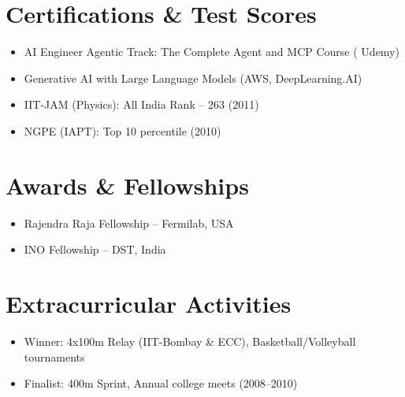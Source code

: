 \documentclass[a4paper,10pt]{article}
\begin{document}
\section{Certifications \& Test Scores}
\begin{itemize}[leftmargin=0.5cm]
 \item AI Engineer Agentic Track: The Complete Agent and MCP Course ( Udemy)
  \item Generative AI with Large Language Models (AWS, DeepLearning.AI)
  \item IIT-JAM (Physics): All India Rank – 263 (2011)
  \item NGPE (IAPT): Top 10 percentile (2010)
\end{itemize}

\section{Awards \& Fellowships}
\begin{itemize}[leftmargin=0.5cm]
  \item Rajendra Raja Fellowship – Fermilab, USA
  \item INO Fellowship – DST, India
\end{itemize}

\section{Extracurricular Activities}
\begin{itemize}[leftmargin=0.5cm]
  \item Winner: 4x100m Relay (IIT-Bombay \& ECC), Basketball/Volleyball tournaments
  \item Finalist: 400m Sprint, Annual college meets (2008–2010)
\end{itemize}
\end{document}
